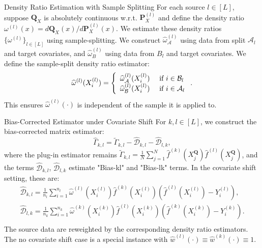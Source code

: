 \documentclass{beamer}
\begin{document}
\begin{frame}{Density Ratio Estimation with Sample Splitting}
    For each source $l \in [ L ]$, suppose $\mathbf { Q } _ { X }$ is absolutely continuous w.r.t. $\mathbf { P } _ { X } ^ { ( l ) }$ and define the density ratio $\omega ^ { ( l ) } ( x ) = d \mathbf { Q } _ { X } ( x ) / d \mathbf { P } _ { X } ^ { ( l ) } ( x )$. We estimate these density ratios $\{ \omega ^ { ( l ) } \} _ { l \in [ L ] }$ using sample-splitting. We construct $\widehat { \omega } _ { \mathcal { A } } ^ { ( l ) }$ using data from split $\mathcal { A } _ { l }$ and target covariates, and $\widehat { \omega } _ { B } ^ { ( l ) }$ using data from $B _ { l }$ and target covariates. We define the sample-split density ratio estimator:
    $$
    \widehat {\omega} ^ {(l)} (X _ {i} ^ {(l)}) = \left\{ \begin{array}{l l} \widehat {\omega} _ {\mathcal {A}} ^ {(l)} (X _ {i} ^ {(l)}) & \text { if   } i \in \mathcal {B} _ {l} \\ \widehat {\omega} _ {\mathcal {B}} ^ {(l)} (X _ {i} ^ {(l)}) & \text { if   } i \in \mathcal {A} _ {l} \end{array} \right.. 
    $$
    This ensures $\widehat { \omega } ^ { ( l ) } ( \cdot )$ is independent of the sample it is applied to.
\end{frame}

\begin{frame}{Bias-Corrected Estimator under Covariate Shift}
    For $k , l \in [ L ]$, we construct the bias-corrected matrix estimator:
    $$
    \widehat {\Gamma} _ {k, l} = \widetilde {\Gamma} _ {k, l} - \widehat {\mathcal {D}} _ {k, l} - \widehat {\mathcal {D}} _ {l, k}, 
    $$
    where the plug-in estimator remains $\widetilde { \Gamma } _ { k , l } = \frac { 1 } { N } \sum _ { j = 1 } ^ { N } \widehat { f } ^ { ( k ) } ( X _ { j } ^ { \mathbf { Q } } ) \widehat { f } ^ { ( l ) } ( X _ { j } ^ { \mathbf { Q } } )$, and the terms $\widehat { \mathcal { D } } _ { k , l }$, $\widehat { \mathcal { D } } _ { l , k }$ estimate "Bias-kl" and "Bias-lk" terms. In the covariate shift setting, these are:
    $$
    \begin{array}{l} \widehat {\mathcal {D}} _ {k, l} = \frac {1}{n _ {l}} \sum_ {i = 1} ^ {n _ {l}} \widehat {\omega} ^ {(l)} (X _ {i} ^ {(l)}) \widehat {f} ^ {(k)} (X _ {i} ^ {(l)}) \left(\widehat {f} ^ {(l)} (X _ {i} ^ {(l)}) - Y _ {i} ^ {(l)}\right), \\ \widehat {\mathcal {D}} _ {l, k} = \frac {1}{n _ {k}} \sum_ {i = 1} ^ {n _ {k}} \widehat {\omega} ^ {(k)} (X _ {i} ^ {(k)}) \widehat {f} ^ {(l)} (X _ {i} ^ {(k)}) \left(\widehat {f} ^ {(k)} (X _ {i} ^ {(k)}) - Y _ {i} ^ {(k)}\right). \\ \end{array}
    $$
    The source data are reweighted by the corresponding density ratio estimators. The no covariate shift case is a special instance with $\widehat { w } ^ { ( l ) } ( \cdot ) \equiv \widehat { w } ^ { ( k ) } ( \cdot ) \equiv 1$.
\end{frame}
\end{document}
